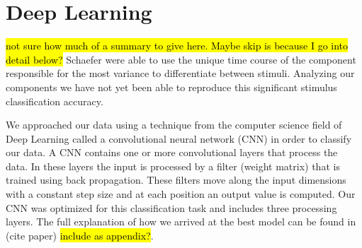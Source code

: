\chapter{Deep Learning}
\hl{not sure how much of a summary to give here. Maybe skip is because I go into detail below?}
Schaefer \etal \cite{schaefer_name_2011} were able to use the unique time course of the component responsible for the most variance to differentiate between stimuli.
Analyzing our components we have not yet been able to reproduce this significant stimulus classification accuracy. 
 
We approached our data using a technique from the computer science field of Deep Learning called a convolutional neural network (\ac{CNN}) in order to classify our data.
A \ac{CNN} contains one or more convolutional layers that process the data.
In these layers the input is processed by a filter (weight matrix) that is trained using back propagation. 
These filters move along the input dimensions with a constant step size and at each position an output value is computed.
Our \ac{CNN} was optimized for this classification task and includes three processing layers.
The full explanation of how we arrived at the best model can be found in (cite paper) \hl{include as appendix?}.

